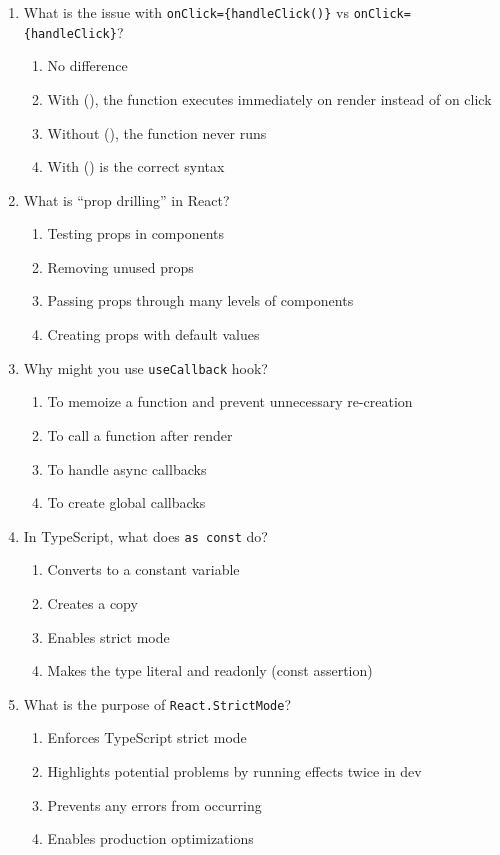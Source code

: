 \documentclass[12pt,a4paper]{article}
\begin{document}
\begin{enumerate}
\item What is the issue with \texttt{onClick=\{handleClick()\}} vs \texttt{onClick=\{handleClick\}}?
\begin{enumerate}[label=\Alph*)]
    \item No difference
    \item With (), the function executes immediately on render instead of on click
    \item Without (), the function never runs
    \item With () is the correct syntax
\end{enumerate}

\item What is ``prop drilling'' in React?
\begin{enumerate}[label=\Alph*)]
    \item Testing props in components
    \item Removing unused props
    \item Passing props through many levels of components
    \item Creating props with default values
\end{enumerate}

\item Why might you use \texttt{useCallback} hook?
\begin{enumerate}[label=\Alph*)]
    \item To memoize a function and prevent unnecessary re-creation
    \item To call a function after render
    \item To handle async callbacks
    \item To create global callbacks
\end{enumerate}

\item In TypeScript, what does \texttt{as const} do?
\begin{enumerate}[label=\Alph*)]
    \item Converts to a constant variable
    \item Creates a copy
    \item Enables strict mode
    \item Makes the type literal and readonly (const assertion)
\end{enumerate}

\item What is the purpose of \texttt{React.StrictMode}?
\begin{enumerate}[label=\Alph*)]
    \item Enforces TypeScript strict mode
    \item Highlights potential problems by running effects twice in dev
    \item Prevents any errors from occurring
    \item Enables production optimizations
\end{enumerate}


\end{enumerate}
\end{document}
